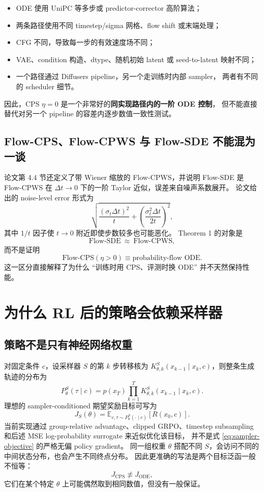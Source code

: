 \documentclass[11pt,a4paper]{article}
\begin{document}
\begin{itemize}
  \item ODE 使用 UniPC\cite{unipc} 等多步或 predictor-corrector 高阶算法；
  \item 两条路径使用不同 timestep/sigma 网格、flow shift 或末端处理；
  \item CFG 不同，导致每一步的有效速度场不同；
  \item VAE、condition 构造、dtype、随机初始 latent 或 seed-to-latent 映射不同；
  \item 一个路径通过 Diffusers pipeline，另一个走训练时内部 sampler，
  两者有不同的 scheduler 细节。
\end{itemize}

因此，CPS $\eta=0$ 是一个非常好的\textbf{同实现路径内的一阶 ODE 控制}，
但不能直接替代对另一个 pipeline 的容差内逐步数值一致性测试。

\subsection{Flow-CPS、Flow-CPWS 与 Flow-SDE 不能混为一谈}

论文第 4.4 节还定义了带 Wiener 缩放的 Flow-CPWS，并说明 Flow-SDE 是
Flow-CPWS 在 $\Delta t\to0$ 下的一阶 Taylor 近似，误差来自噪声系数展开。
论文给出的 noise-level error 形式为
\[
  \sqrt{
    \frac{(\sigma_t\Delta t)^2}{t}
    +\left(\frac{\sigma_t^2\Delta t}{2t}\right)^2
  },
\]
其中 $1/t$ 因子使 $t\to0$ 附近即使步数较多也可能恶化。
Theorem 1 的对象是
\[
  \text{Flow-SDE}\ \approx\ \text{Flow-CPWS},
\]
而不是证明
\[
  \text{Flow-CPS}(\eta>0)
  \equiv
  \text{probability-flow ODE}.
\]
这一区分直接解释了为什么 ``训练时用 CPS、评测时换 ODE'' 并不天然保持性能。

\section{为什么 RL 后的策略会依赖采样器}

\subsection{策略不是只有神经网络权重}

对固定条件 $c$，设采样器 $S$ 的第 $k$ 步转移核为
$K_{\theta,k}^{S}(x_{k-1}\mid x_k,c)$，则整条生成轨迹的分布为
\begin{equation}
  P_\theta^S(\tau\mid c)
  =p(x_T)\prod_{k=1}^{T}
    K_{\theta,k}^{S}(x_{k-1}\mid x_k,c).
  \label{eq:trajectory}
\end{equation}
理想的 sampler-conditioned 期望奖励目标可写为
\begin{equation}
  J_S(\theta)
  =\mathbb{E}_{c,\tau\sim P_\theta^S(\cdot\mid c)}
     \left[R(x_0,c)\right].
  \label{eq:sampler-objective}
\end{equation}
当前实现通过 group-relative advantage、clipped GRPO、timestep subsampling
和后述 MSE log-probability surrogate 来近似优化该目标，
并不是式 \eqref{eq:sampler-objective} 的严格无偏 policy gradient。
同一组权重 $\theta$ 搭配不同 $S$，会访问不同的中间状态分布，也会产生不同终点分布。
因此更准确的写法是两个目标泛函一般不恒等：
\[
  J_{\mathrm{CPS}}\not\equiv J_{\mathrm{ODE}},
\]
它们在某个特定 $\theta$ 上可能偶然取到相同数值，但没有一般保证。
\end{document}
